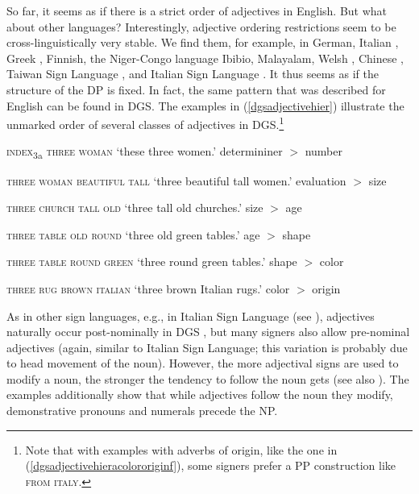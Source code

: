 So far, it seems as if there is a strict order of adjectives in English. But what about other languages? Interestingly, adjective ordering restrictions seem to be cross-linguistically very stable. We find them, for example, in German, Italian \citep{cinque2010syntax}, Greek \citep{alexiadou2001adjective}, Finnish, the Niger-Congo language Ibibio, Malayalam, Welsh \citep{scott2002stacked}, Chinese \citep{sproat1991cross}, Taiwan Sign Language \citep{zhang2007universal}, and Italian Sign Language \citep{bertone2009syntax, mantovan2017nominalmoditalian}. It thus seems as if the structure of the DP is fixed. In fact, the same pattern that was described for English can be found in DGS. The examples in (\ref{dgsadjectivehier}) illustrate the unmarked order of several classes of adjectives in DGS.\footnote{ Note that with examples with adverbs of origin, like the one in (\ref{dgsadjectivehieracolororiginf}), some signers prefer a PP construction like \textsc{from italy}.}

\begin{exe}
\ex\label{dgsadjectivehier}\begin{xlist} 
\ex \textsc{index}\textsubscript{3a} \textsc{three woman} 
\glt `these three women.' \hfill determininer $>$ number \label{dgsadjectivehiera}

\ex \textsc{three woman beautiful tall} 
\glt `three beautiful tall women.' \hfill evaluation $>$ size \label{dgsadjectivehierb}

\ex \textsc{three church tall old} 
\glt `three tall old churches.' \hfill size $>$ age \label{dgsadjectivehierc}

\ex \textsc{three table old round}%
\glt `three old green tables.' \hfill age $>$ shape \label{dgsadjectivehierd}

\ex  \textsc{three table round green}%
\glt `three round green tables.' \hfill shape $>$ color \label{dgsadjectivehiere}

\ex \textsc{three rug brown italian} 
\glt `three brown Italian rugs.' \hfill color $>$ origin \label{dgsadjectivehieracolororiginf}
\end{xlist}
\end{exe}

\noindent As in other sign languages, e.g., in Italian Sign Language (see \citealt[284]{cecchetto2009another}), adjectives naturally occur post-nominally in DGS \citep[18]{herrmann2013modal}, but many signers also allow pre-nominal adjectives (again, similar to Italian Sign Language; this variation is probably due to head movement of the noun). However, the more adjectival signs are used to modify a noun, the stronger the tendency to follow the noun gets (see also \citealt[146]{papaspyrou2008grammatik}). The examples additionally show that while adjectives follow the noun they modify, demonstrative pronouns and numerals precede the NP.

